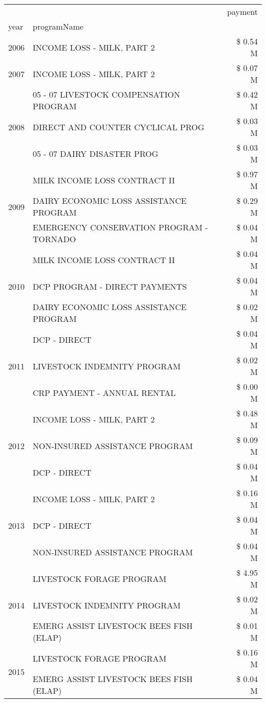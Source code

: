 \begin{tabular}{llr}
\toprule
 &  & payment \\
year & programName &  \\
\midrule
2006 & INCOME LOSS - MILK, PART 2 & \$ 0.54 M \\
\cline{1-3}
2007 & INCOME LOSS - MILK, PART 2 & \$ 0.07 M \\
\cline{1-3}
\multirow[t]{3}{*}{2008} & 05 - 07 LIVESTOCK COMPENSATION PROGRAM & \$ 0.42 M \\
 & DIRECT AND COUNTER CYCLICAL PROG & \$ 0.03 M \\
 & 05 - 07 DAIRY DISASTER PROG & \$ 0.03 M \\
\cline{1-3}
\multirow[t]{3}{*}{2009} & MILK INCOME LOSS CONTRACT II & \$ 0.97 M \\
 & DAIRY ECONOMIC LOSS ASSISTANCE PROGRAM & \$ 0.29 M \\
 & EMERGENCY CONSERVATION PROGRAM - TORNADO & \$ 0.04 M \\
\cline{1-3}
\multirow[t]{3}{*}{2010} & MILK INCOME LOSS CONTRACT II & \$ 0.04 M \\
 & DCP PROGRAM - DIRECT PAYMENTS & \$ 0.04 M \\
 & DAIRY ECONOMIC LOSS ASSISTANCE PROGRAM & \$ 0.02 M \\
\cline{1-3}
\multirow[t]{3}{*}{2011} & DCP - DIRECT & \$ 0.04 M \\
 & LIVESTOCK INDEMNITY PROGRAM & \$ 0.02 M \\
 & CRP PAYMENT - ANNUAL RENTAL & \$ 0.00 M \\
\cline{1-3}
\multirow[t]{3}{*}{2012} & INCOME LOSS - MILK, PART 2 & \$ 0.48 M \\
 & NON-INSURED ASSISTANCE PROGRAM & \$ 0.09 M \\
 & DCP - DIRECT & \$ 0.04 M \\
\cline{1-3}
\multirow[t]{3}{*}{2013} & INCOME LOSS - MILK, PART 2 & \$ 0.16 M \\
 & DCP - DIRECT & \$ 0.04 M \\
 & NON-INSURED ASSISTANCE PROGRAM & \$ 0.04 M \\
\cline{1-3}
\multirow[t]{3}{*}{2014} & LIVESTOCK FORAGE PROGRAM & \$ 4.95 M \\
 & LIVESTOCK INDEMNITY PROGRAM & \$ 0.02 M \\
 & EMERG ASSIST LIVESTOCK BEES FISH (ELAP) & \$ 0.01 M \\
\cline{1-3}
\multirow[t]{3}{*}{2015} & LIVESTOCK FORAGE PROGRAM & \$ 0.16 M \\
 & EMERG ASSIST LIVESTOCK BEES FISH (ELAP) & \$ 0.04 M \\

\end{tabular}
